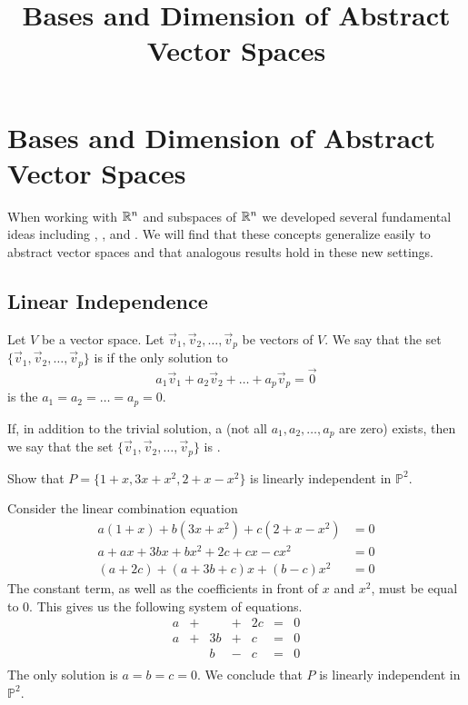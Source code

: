 \documentclass{ximera}
\title{Bases and Dimension of Abstract Vector Spaces} \license{CC BY-NC-SA 4.0}
\begin{document}
\begin{abstract}
\end{abstract}
\maketitle


\section*{Bases and Dimension of Abstract Vector Spaces}
When working with $\mathbb{R}^n$ and subspaces of $\mathbb{R}^n$ we developed several fundamental ideas including , ,  and .  We will find that these concepts generalize easily to abstract vector spaces and that analogous results hold in these new settings.
\subsection*{Linear Independence}
\begin{definition}\label{def:linearindependenceabstract}
Let $V$ be a vector space.  Let $\vec{v}_1, \vec{v}_2,\ldots ,\vec{v}_p$ be vectors of $V$.  We say that the set $\{\vec{v}_1, \vec{v}_2,\ldots ,\vec{v}_p\}$ is  if the only solution to 
$$a_1\vec{v}_1+a_2\vec{v}_2+\ldots +a_p\vec{v}_p=\vec{0}$$
is the  $a_1=a_2=\ldots =a_p=0$.

If, in addition to the trivial solution, a  (not all $a_1, a_2,\ldots ,a_p$ are zero) exists, then we say that the set $\{\vec{v}_1, \vec{v}_2,\ldots ,\vec{v}_p\}$ is .
\end{definition}

\begin{example}\label{ex:polyindset} 
Show that $P=\{1 + x, 3x + x^{2}, 2 + x - x^{2}\}$ is linearly independent in $\mathbb{P}^{2}$.

\begin{explanation}
Consider the linear combination equation
\begin{align*}
a(1 + x) + b(3x + x^2) + c(2 + x - x^2) &= 0\\
a+ax+3bx+bx^2+2c+cx-cx^2&=0\\
(a+2c)+(a+3b+c)x+(b-c)x^2&=0
\end{align*}
The constant term, as well as the coefficients in front of $x$ and $x^2$, must be equal to $0$.  This gives us the following system of equations.
\begin{equation*}
\begin{array}{rlrlrcr}
	a & + &      & + & 2c & = & 0 \\
	a & + & 3b & + &  c & = & 0 \\
	    &   &  b & - &  c & = & 0 \\
\end{array}
\end{equation*}
The only solution is $a = b = c = 0$.  We conclude that $P$ is linearly independent in $\mathbb{P}^2$.
\end{explanation}
\end{example}
\end{document}
